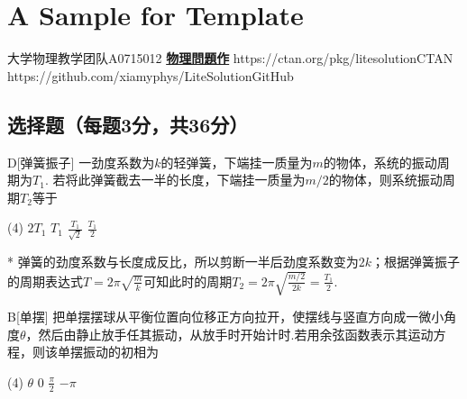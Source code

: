 \chapter{A Sample for  Template}
\fancyhead[R]{\color{H6}\kaishu\rightmark\,}

\date{2023年12月3日}{大学物理教学团队}{A0715012}
{\href{https://qm.qq.com/q/UPbGudx8cK}{\textbf{物理問題作}}}
{https://ctan.org/pkg/litesolution}{CTAN}
{https://github.com/xiamyphys/LiteSolution}{GitHub}

\section{选择题（每题3分，共36分）}
\begin{choice}{D}[弹簧振子]
    一劲度系数为$k$的轻弹簧，下端挂一质量为$m$的物体，系统的振动周期为$T_1$. 若将此弹簧截去一半的长度，下端挂一质量为$m/2$的物体，则系统振动周期$T_2$等于
\begin{tasks}(4)
    \task $2T_1$
    \task $T_1$
    \task $\frac{T_1}{\sqrt2}$
    \task $\frac{T_1}{2}$
\end{tasks}
\end{choice}
\begin{solution}*
    弹簧的劲度系数与长度成反比，所以剪断一半后劲度系数变为$2k$；根据弹簧振子的周期表达式$T=2\pi\sqrt{\frac mk}$可知此时的周期$T_2=2\pi\sqrt{\frac{m/2}{2k}}=\frac{T_1}{2}$.
\end{solution}

\begin{choice}{B}[单摆]
    把单摆摆球从平衡位置向位移正方向拉开，使摆线与竖直方向成一微小角度$\theta$，然后由静止放手任其振动，从放手时开始计时.若用余弦函数表示其运动方程，则该单摆振动的初相为
    \begin{tasks}(4)
        \task $\theta$
        \task $0$
        \task $\frac\pi2$
        \task $-\pi$
    \end{tasks}
\end{choice}

